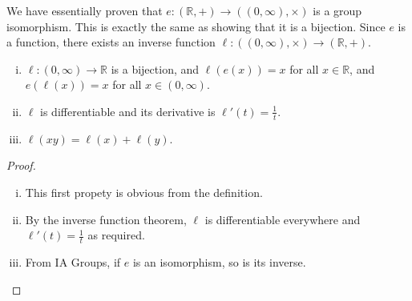\begin{remark}
	We have essentially proven that \(e \colon (\mathbb R, +) \to ((0, \infty), \times)\) is a group isomorphism.
	This is exactly the same as showing that it is a bijection.
	Since \(e\) is a function, there exists an inverse function \(\ell \colon ((0, \infty), \times) \to (\mathbb R, +)\).
\end{remark}
\begin{theorem}
	\begin{enumerate}[(i)]
		\item \(\ell \colon (0, \infty) \to \mathbb R\) is a bijection, and \(\ell(e(x)) = x\) for all \(x \in \mathbb R\), and \(e(\ell(x)) = x\) for all \(x \in (0, \infty)\).
		\item \(\ell\) is differentiable and its derivative is \(\ell'(t) = \frac{1}{t}\).
		\item \(\ell(xy) = \ell(x) + \ell(y)\).
	\end{enumerate}
\end{theorem}
\begin{proof}
	\begin{enumerate}[(i)]
		\item This first propety is obvious from the definition.
		\item By the inverse function theorem, \(\ell\) is differentiable everywhere and \(\ell'(t) = \frac{1}{t}\) as required.
		\item From IA Groups, if \(e\) is an isomorphism, so is its inverse.
	\end{enumerate}
\end{proof}

